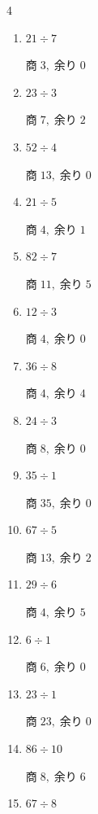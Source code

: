 \begin{multicols}{4}
\begin{enumerate}
        $商\; 8,\; 余り\; 5$

  \item $21 \div 7$

        $商\; 3,\; 余り\; 0$

  \item $23 \div 3$

        $商\; 7,\; 余り\; 2$

  \item $52 \div 4$

        $商\; 13,\; 余り\; 0$

  \item $21 \div 5$

        $商\; 4,\; 余り\; 1$

  \item $82 \div 7$

        $商\; 11,\; 余り\; 5$

  \item $12 \div 3$

        $商\; 4,\; 余り\; 0$

\columnbreak %

  \item $36 \div 8$

        $商\; 4,\; 余り\; 4$

  \item $24 \div 3$

        $商\; 8,\; 余り\; 0$

  \item $35 \div 1$

        $商\; 35,\; 余り\; 0$

  \item $67 \div 5$

        $商\; 13,\; 余り\; 2$

  \item $29 \div 6$

        $商\; 4,\; 余り\; 5$

  \item $6 \div 1$

        $商\; 6,\; 余り\; 0$

  \item $23 \div 1$

        $商\; 23,\; 余り\; 0$

  \item $86 \div 10$

        $商\; 8,\; 余り\; 6$

  \item $67 \div 8$


\end{enumerate}
\end{multicols}
